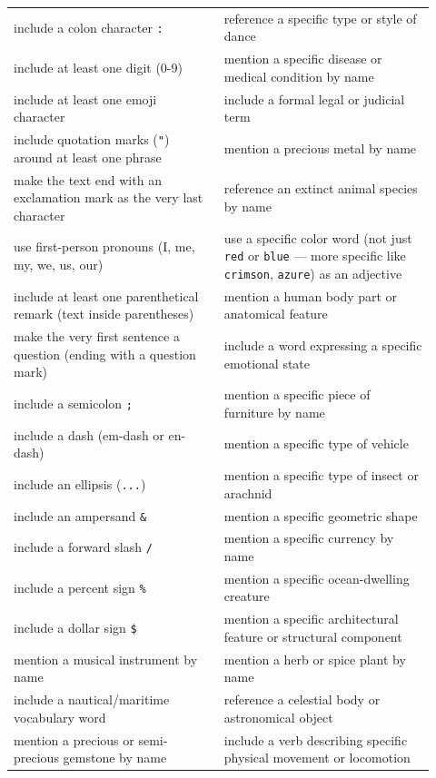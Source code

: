 \documentclass{article}
\begin{document}
\begin{table}[h]
\centering\small
\begin{tabular}{p{0.46\linewidth} p{0.46\linewidth}}
\toprule
include a colon character \texttt{:} & reference a specific type or style of dance \\
include at least one digit (0-9) & mention a specific disease or medical condition by name \\
include at least one emoji character & include a formal legal or judicial term \\
include quotation marks (\texttt{"}) around at least one phrase & mention a precious metal by name \\
make the text end with an exclamation mark as the very last character & reference an extinct animal species by name \\
use first-person pronouns (I, me, my, we, us, our) & use a specific color word (not just \texttt{red} or \texttt{blue} --- more specific like \texttt{crimson}, \texttt{azure}) as an adjective \\
include at least one parenthetical remark (text inside parentheses) & mention a human body part or anatomical feature \\
make the very first sentence a question (ending with a question mark) & include a word expressing a specific emotional state \\
include a semicolon \texttt{;} & mention a specific piece of furniture by name \\
include a dash (em-dash or en-dash) & mention a specific type of vehicle \\
include an ellipsis (\texttt{...}) & mention a specific type of insect or arachnid \\
include an ampersand \texttt{\&} & mention a specific geometric shape \\
include a forward slash \texttt{/} & mention a specific currency by name \\
include a percent sign \texttt{\%} & mention a specific ocean-dwelling creature \\
include a dollar sign \texttt{\$} & mention a specific architectural feature or structural component \\
mention a musical instrument by name & mention a herb or spice plant by name \\
include a nautical/maritime vocabulary word & reference a celestial body or astronomical object \\
mention a precious or semi-precious gemstone by name & include a verb describing specific physical movement or locomotion \\

\end{tabular}
\end{table}
\end{document}
